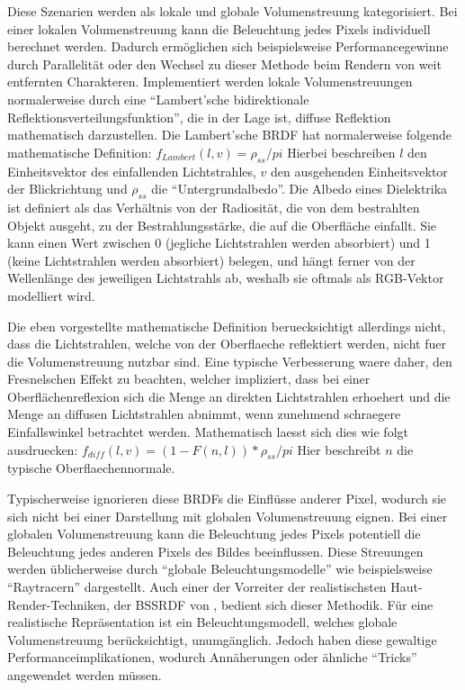 \documentclass[ngerman,runningheads,a4paper]{llncs}[2018/03/10]
\begin{document}
Diese Szenarien werden als lokale und globale Volumenstreuung kategorisiert.
Bei einer lokalen Volumenstreuung kann die Beleuchtung jedes Pixels individuell berechnet werden.
Dadurch ermöglichen sich beispielsweise Performancegewinne durch Parallelität oder den Wechsel zu dieser Methode beim Rendern von weit entfernten Charakteren.
Implementiert werden lokale Volumenstreuungen normalerweise durch eine \enquote{Lambert'sche  bidirektionale Reflektionsverteilungsfunktion}, die in der Lage ist, diffuse Reflektion mathematisch darzustellen. Die Lambert'sche BRDF hat normalerweise folgende mathematische Definition: $f_{Lambert}(l, v) = \rho_{ss} / pi$ \cite{real-time-rendering}
Hierbei beschreiben $l$ den Einheitsvektor des einfallenden Lichtstrahles, $v$ den ausgehenden Einheitsvektor der Blickrichtung und $\rho_{ss}$ die \enquote{Untergrundalbedo}.
Die Albedo eines Dielektrika ist definiert als das Verhältnis von der Radiosität, die von dem bestrahlten Objekt ausgeht, zu der Bestrahlungsstärke, die auf die Oberfläche einfallt.
Sie kann einen Wert zwischen 0 (jegliche Lichtstrahlen werden absorbiert) und 1 (keine Lichtstrahlen werden absorbiert) belegen, und hängt ferner von der Wellenlänge des jeweiligen Lichtstrahls ab, weshalb sie oftmals als RGB-Vektor modelliert wird.\cite{real-time-rendering}

Die eben vorgestellte mathematische Definition beruecksichtigt allerdings nicht, dass die Lichtstrahlen, welche von der Oberflaeche reflektiert werden, nicht fuer die Volumenstreuung nutzbar sind.
Eine typische Verbesserung waere daher, den Fresnelschen Effekt zu beachten, welcher impliziert, dass bei einer Oberflächenreflexion sich die Menge an direkten Lichtstrahlen erhoehert und die Menge an diffusen Lichtstrahlen abnimmt, wenn zunehmend schraegere Einfallswinkel betrachtet werden.
Mathematisch laesst sich dies wie folgt ausdruecken:
$f_{diff}(l, v) = (1 - F(n, l)) * \rho_{ss} / pi$ \cite{real-time-rendering}
Hier beschreibt $n$ die typische Oberflaechennormale.

Typischerweise ignorieren diese BRDFs die Einflüsse anderer Pixel, wodurch sie sich nicht bei einer Darstellung mit globalen Volumenstreuung eignen.
Bei einer globalen Volumenstreuung kann die Beleuchtung jedes Pixels potentiell die Beleuchtung jedes anderen Pixels des Bildes beeinflussen.
Diese Streuungen werden üblicherweise durch \enquote{globale Beleuchtungsmodelle} wie beispielsweise \enquote{Raytracern} dargestellt.
Auch einer der Vorreiter der realistischsten Haut-Render-Techniken, der BSSRDF von \citet{spectral-bssrdf-human-skin}, bedient sich dieser Methodik.
Für eine realistische Repräsentation ist ein Beleuchtungsmodell, welches globale Volumenstreuung berücksichtigt, unumgänglich.
Jedoch haben diese gewaltige Performanceimplikationen, wodurch Annäherungen oder ähnliche \enquote{Tricks} angewendet werden müssen.
\end{document}
